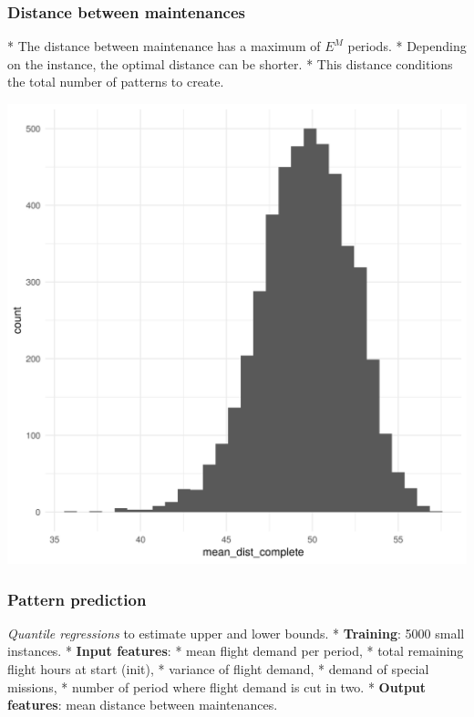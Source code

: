 \begin{frame}
\frametitle{\textbf{Distance between maintenances}}

* The distance between maintenance has a maximum of
\(E^{M}\) periods. 
* Depending on the instance, the optimal distance can
be shorter. 
* This distance conditions the total number of patterns to
create.

\includegraphics[width=1\linewidth]{hist_mean_dist_complete_IT000125_20190716}

\end{frame}

\begin{frame}
  \frametitle{\textbf{Pattern prediction}}

  \emph{Quantile regressions} to estimate upper and lower bounds. 
  * \textbf{Training}: 5000 small instances. 
  * \textbf{Input features}: 
    * mean flight demand per period, 
    * total remaining flight hours at start (init), 
    * variance of flight demand, 
    * demand of special missions, 
    * number of period where flight demand is cut in two. 
  * \textbf{Output features}: mean distance between maintenances.
\end{frame}

